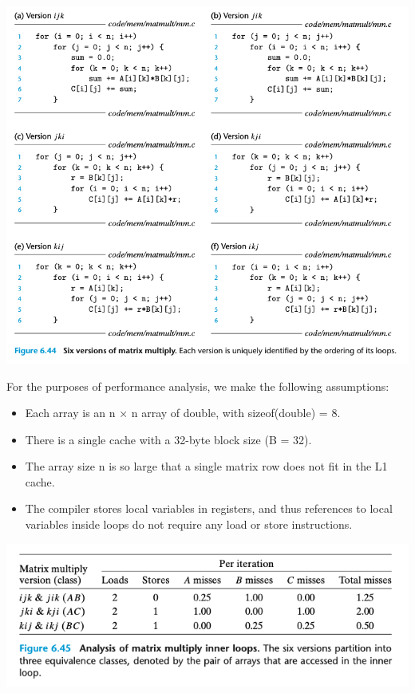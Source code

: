 \documentclass[11pt]{article}
\begin{document}
\begin{center}
\includegraphics[width=.9\linewidth]{pics/figure6.44-matrix-multiply.png}
\end{center}


For the purposes of performance analysis, we make the following assumptions:\\
\begin{itemize}
\item Each array is an n × n array of double, with sizeof(double) = 8.\\
\item There is a single cache with a 32-byte block size (B = 32).\\
\item The array size n is so large that a single matrix row does not fit in the L1 cache.\\
\item The compiler stores local variables in registers, and thus references to local variables inside loops do not require any load or store instructions.\\
\end{itemize}


\begin{center}
\includegraphics[width=.9\linewidth]{pics/figure6.45-analysis-of-matrix-multiply.png}
\end{center}
\end{document}
